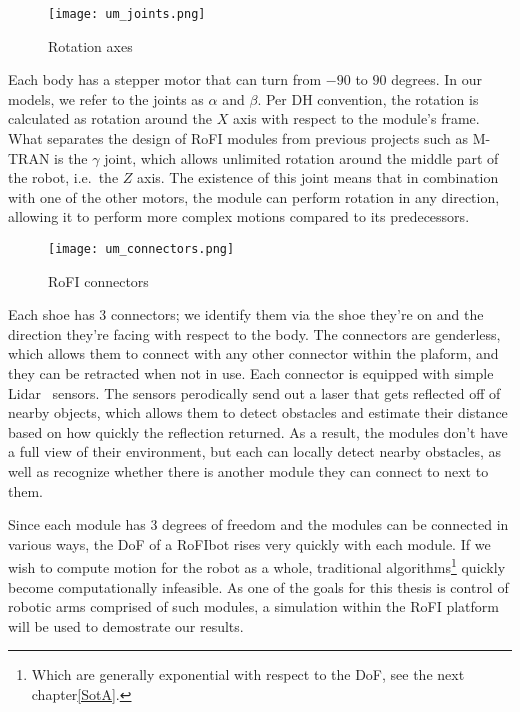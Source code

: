 \begin{wrapfigure}{l}{0.3\textwidth}
    \centering
    \texttt{[image: um\_joints.png]}
  \caption{Rotation axes~\cite{rofiUm}}\label{fig:um_rot}
\end{wrapfigure}

Each body has a stepper motor that can turn from $-90$ to $90$ degrees. In our models, we refer to the joints as $\alpha$ and $\beta$. Per DH convention, the rotation is calculated as rotation around the $X$ axis with respect to the module's frame. What separates the design of RoFI modules from previous projects such as M-TRAN is the $\gamma$ joint, which allows unlimited rotation around the middle part of the robot, i.e.\ the $Z$ axis. The existence of this joint means that in combination with one of the other motors, the module can perform rotation in any direction, allowing it to perform more complex motions compared to its predecessors.

\begin{wrapfigure}{r}{0.3\textwidth}
    \centering
    \texttt{[image: um\_connectors.png]}
  \caption{RoFI connectors~\cite{rofiUm}}\label{fig:um_con}
\end{wrapfigure}

Each shoe has 3 connectors; we identify them via the shoe they're on and the direction they're facing with respect to the body. The connectors are genderless, which allows them to connect with any other connector within the plaform, and they can be retracted when not in use. Each connector is equipped with simple Lidar~\cite{Lidar} sensors. The sensors perodically send out a laser that gets reflected off of nearby objects, which allows them to detect obstacles and estimate their distance based on how quickly the reflection returned. As a result, the modules don't have a full view of their environment, but each can locally detect nearby obstacles, as well as recognize whether there is another module they can connect to next to them.

Since each module has 3 degrees of freedom and the modules can be connected in various ways, the DoF of a RoFIbot rises very quickly with each module. If we wish to compute motion for the robot as a whole, traditional algorithms\footnote{Which are generally exponential with respect to the DoF, see the next chapter\ref{SotA}.} quickly become computationally infeasible. As one of the goals for this thesis is control of robotic arms comprised of such modules, a simulation within the RoFI platform will be used to demostrate our results.
